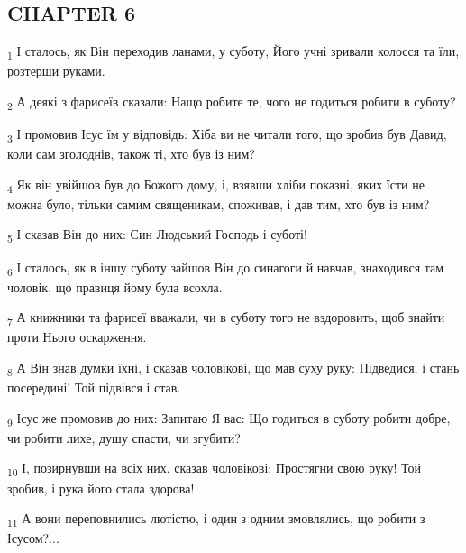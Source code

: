 \subsection{CHAPTER 6}
\begin{tcolorbox}
\textsubscript{1} І сталось, як Він переходив ланами, у суботу, Його учні зривали колосся та їли, розтерши руками.
\end{tcolorbox}
\begin{tcolorbox}
\textsubscript{2} А деякі з фарисеїв сказали: Нащо робите те, чого не годиться робити в суботу?
\end{tcolorbox}
\begin{tcolorbox}
\textsubscript{3} І промовив Ісус їм у відповідь: Хіба ви не читали того, що зробив був Давид, коли сам зголоднів, також ті, хто був із ним?
\end{tcolorbox}
\begin{tcolorbox}
\textsubscript{4} Як він увійшов був до Божого дому, і, взявши хліби показні, яких їсти не можна було, тільки самим священикам, споживав, і дав тим, хто був із ним?
\end{tcolorbox}
\begin{tcolorbox}
\textsubscript{5} І сказав Він до них: Син Людський Господь і суботі!
\end{tcolorbox}
\begin{tcolorbox}
\textsubscript{6} І сталось, як в іншу суботу зайшов Він до синагоги й навчав, знаходився там чоловік, що правиця йому була всохла.
\end{tcolorbox}
\begin{tcolorbox}
\textsubscript{7} А книжники та фарисеї вважали, чи в суботу того не вздоровить, щоб знайти проти Нього оскарження.
\end{tcolorbox}
\begin{tcolorbox}
\textsubscript{8} А Він знав думки їхні, і сказав чоловікові, що мав суху руку: Підведися, і стань посередині! Той підвівся і став.
\end{tcolorbox}
\begin{tcolorbox}
\textsubscript{9} Ісус же промовив до них: Запитаю Я вас: Що годиться в суботу робити добре, чи робити лихе, душу спасти, чи згубити?
\end{tcolorbox}
\begin{tcolorbox}
\textsubscript{10} І, позирнувши на всіх них, сказав чоловікові: Простягни свою руку! Той зробив, і рука його стала здорова!
\end{tcolorbox}
\begin{tcolorbox}
\textsubscript{11} А вони переповнились лютістю, і один з одним змовлялись, що робити з Ісусом?...
\end{tcolorbox}
